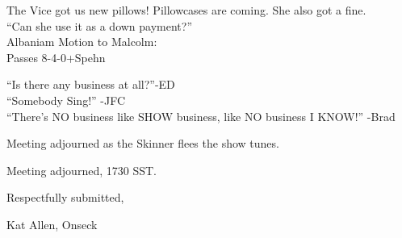 \documentclass[10pt]{article}
\begin{document}
The Vice got us new pillows! Pillowcases are coming.
She also got a fine.\\
``Can she use it as a down payment?''\\

Albaniam Motion to Malcolm:\\
Passes 8-4-0+Spehn

``Is there any business at all?''-ED\\
``Somebody Sing!'' -JFC\\
``There's NO business like SHOW business, like NO business I KNOW!''
-Brad

Meeting adjourned as the Skinner flees the show tunes.

\vspace{12pt}

\noindent
Meeting adjourned, 1730 SST.

\vspace{18pt}

\centerline{Respectfully submitted,}
\centerline{Kat Allen,  Onseck}
\end{document}
